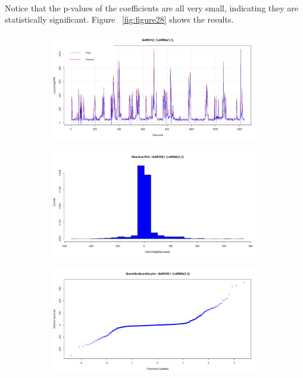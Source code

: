 \documentclass[12pt]{article}
\begin{document}
\paragraph{}
Notice that the p-values of the coefficients are all very small, indicating they are statistically significant. Figure ~\ref{fig:figure28} shows the results.
\begin{figure}[H]
  \centering
  \begin{subfigure}[b]{0.6\linewidth}
    \includegraphics[width=\linewidth]{figure27-1.png}
  \end{subfigure}
  \begin{subfigure}[b]{0.6\linewidth}
    \includegraphics[width=\linewidth]{figure27-2.png}
  \end{subfigure}
  \begin{subfigure}[b]{0.6\linewidth}
    \includegraphics[width=\linewidth]{figure27-3.png}

\end{subfigure}
\end{figure}
\end{document}
